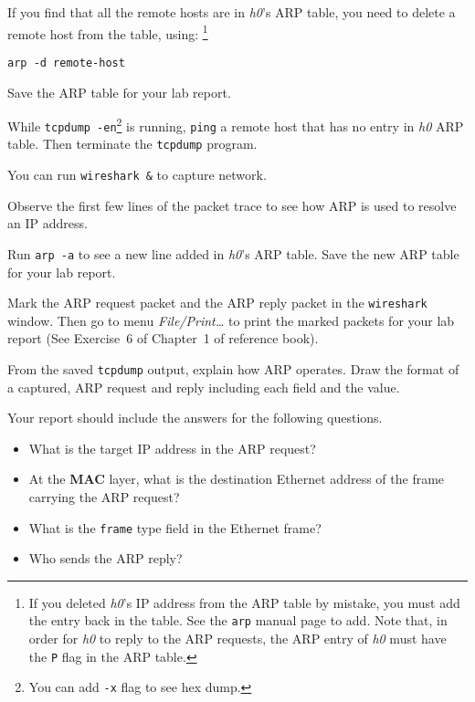 \documentclass{../UTNetLab}
\begin{document}
    If you find that all the remote hosts are in \textit{h0}’s ARP table, you need to delete a remote host from the table, using:
    \footnote{If you deleted \textit{h0}’s IP address from the ARP table by mistake, you must add the entry back in the table.
    See the \lstinline{arp} manual page to add.
    Note that, in order for \textit{h0} to reply to the ARP requests, the ARP entry of \textit{h0} must have the \lstinline{P} flag in the ARP table.}
    \begin{lstlisting}[emph={remote-host}]
arp -d remote-host
    \end{lstlisting}

    Save the ARP table for your lab report.
    
    While \lstinline{tcpdump -en}\footnote{You can add \lstinline{-x} flag to see hex dump.} is running, \lstinline{ping} a remote host that has no entry in \textit{h0} ARP table.
    Then terminate the \lstinline{tcpdump} program.

    You can run \lstinline{wireshark &} to capture network.

    Observe the first few lines of the packet trace to see how ARP is used to resolve an IP address.

    Run \lstinline{arp -a} to see a new line added in \textit{h0}’s ARP table.
    Save the new ARP table for your lab report.

    Mark the ARP request packet and the ARP reply packet in the \lstinline{wireshark} window.
    Then go to menu \textit{File/Print\ldots} to print the marked packets for your lab report (See Exercise~6 of Chapter~1 of reference book).

    \begin{report}
    \item From the saved \lstinline{tcpdump} output, explain how ARP operates.
    Draw the format of a captured, ARP request and reply including each field and the value.
    \end{report}

    Your report should include the answers for the following questions.
    \begin{itemize}
        \item What is the target IP address in the ARP request?
        \item At the \textbf{MAC} layer, what is the destination Ethernet address of the frame carrying the ARP request?
        \item What is the \texttt{frame} type field in the Ethernet frame?
        \item Who sends the ARP reply?
    \end{itemize}
\end{document}
